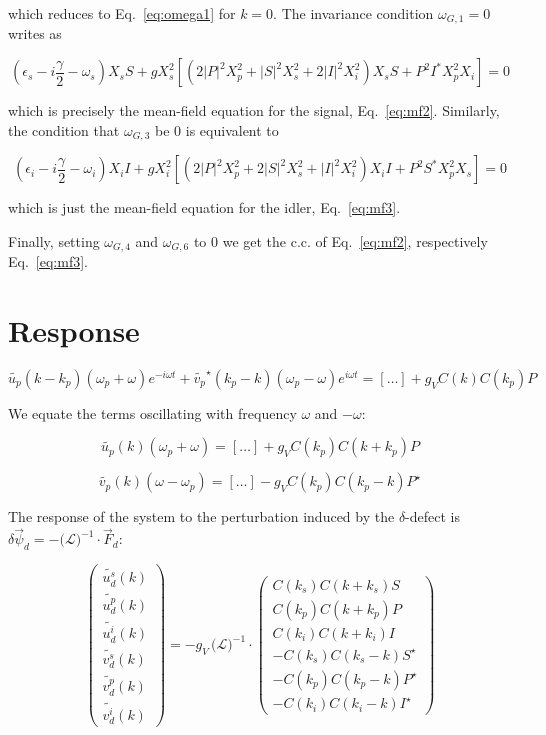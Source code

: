 \documentclass[a4paper,prb,10pt,aps,twocolumn]{revtex4-1}
\begin{document}
which reduces to Eq.~\eqref{eq:omega1} for $k=0$. The invariance condition 
$\omega_{G,1}=0$ writes as

\begin{equation}
\left(\epsilon_{s}-i\frac{\gamma}{2}-
\omega_{s}\right)X_{s}S+gX^{2}_{s}\left[\left(2|P|^{2}X^{2}_{p}+|S|^{2}X^{2}_{s}+
2|I|^{2}X^{2}_{i}\right)X_{s}S+P^{2}I^{*}X^{2}_{p}X_{i}\right]=0
\end{equation}

which is precisely the mean-field equation for the signal, Eq.~\eqref{eq:mf2}. 
Similarly, the condition that $\omega_{G,3}$ be 0 is equivalent to

\begin{equation}
\left(\epsilon_{i}-i\frac{\gamma}{2}-
\omega_{i}\right)X_{i}I+gX_{i}^{2}\left[\left(2|P|^{2}X_{p}^{2}+2|S|^{2}X_{s}^{2}
+|I|^{2}X_{i}^{2}\right)X_{i}I+P^{2}S^{*}X_{p}^{2}X_{s}\right]=0
\end{equation}

which is just the mean-field equation for the idler, Eq.~\eqref{eq:mf3}.

Finally, setting $\omega_{G,4}$ and $\omega_{G,6}$ to 0 we get the c.c. of 
Eq.~\eqref{eq:mf2}, respectively Eq.~\eqref{eq:mf3}.


\section{Response}
\label{sec:response}

\[
\widetilde{u_{p}}(k-k_{p})\left(\omega_{p}+\omega\right)e^{-i\omega 
t}+\widetilde{v_{p}}^{\star}(k_{p}-k)\left(\omega_{p}-\omega\right)e^{i\omega 
t}=\left[\dots\right]+g_{V}C(k)C(k_{p})P
\]

We equate the terms oscillating with frequency $\omega$ and $-\omega$:

\[
\widetilde{u_{p}}
(k)\left(\omega_{p}+\omega\right)=\left[\dots\right]+g_{V}C(k_{p})C(k+k_{p})P
\]

\[
\widetilde{v_{p}}(k)\left(\omega-\omega_{p}\right)=\left[\dots\right]-
g_{V}C(k_{p})C(k_{p}-k)P^{\star}
\]

The response of the system to the perturbation induced by the $\delta$-defect
is $\delta\vec{\psi}_{d}=-\big(\mathcal{L}\big)^{-1}\cdot\vec{F}_{d}$:

\[
\left(\begin{array}{c}
\widetilde{u^s_d}(k)\\
\widetilde{u^p_d}(k)\\
\widetilde{u^i_d}(k)\\
\widetilde{v^s_d}(k)\\
\widetilde{v^p_d}(k)\\
\widetilde{v^i_d}(k)
\end{array}\right)=-g_{V}\,\big(\mathcal{L}\big)^{-1} \cdot 
\left(\begin{array}{c}
C(k_{s})C(k+k_{s})S\\
C(k_{p})C(k+k_{p})P\\
C(k_{i})C(k+k_{i})I\\
-C(k_{s})C(k_{s}-k)S^{\star}\\
-C(k_{p})C(k_{p}-k)P^{\star}\\
-C(k_{i})C(k_{i}-k)I^{\star}
\end{array}\right)
\]
\end{document}
